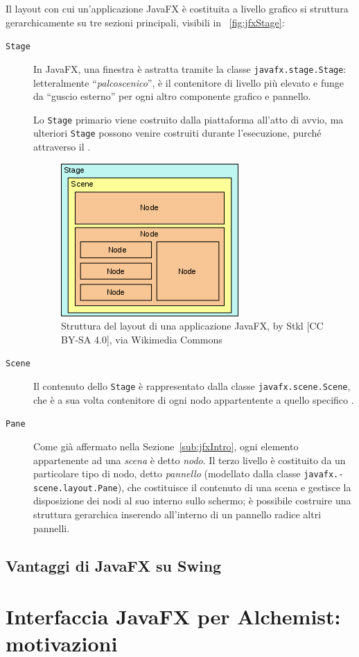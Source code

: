             Il layout con cui un'applicazione JavaFX è costituita a livello grafico si struttura gerarchicamente su tre sezioni principali, visibili in \figurename~\vref{fig:jfxStage}:

            \begin{description}
                \item[\texttt{Stage}] In JavaFX, una finestra è astratta tramite la classe \texttt{javafx\dothyp stage\dothyp Stage}: letteralmente ``\emph{palcoscenico}'',  è il contenitore di livello più elevato e funge da ``guscio esterno'' per ogni altro componente grafico e pannello.

                Lo \texttt{Stage} primario viene costruito dalla piattaforma all'atto di avvio, ma ulteriori \texttt{Stage} possono venire costruiti durante l'esecuzione, purché attraverso il .

            \begin{figure}[htbp]\label{fig:jfxStage}
                \centering
                \includegraphics[scale=1]{img/Javafx-stage-scene-node}
                \caption{Struttura del layout di una applicazione JavaFX, by Stkl [CC BY-SA 4.0], via Wikimedia Commons}
            \end{figure}

                \item[\texttt{Scene}] Il contenuto dello \texttt{Stage} è rappresentato dalla classe \texttt{javafx\dothyp scene\dothyp Scene}, che è a sua volta contenitore di ogni nodo appartentente a quello specifico .

                \item[\texttt{Pane}] Come già affermato nella Sezione~\vref{sub:jfxIntro}, ogni elemento appartenente ad una \emph{scena} è detto \emph{nodo}. Il terzo livello è costituito da un particolare tipo di nodo, detto \emph{pannello} (modellato dalla classe \texttt{javafx\dothyp scene\dothyp layout\dothyp Pane}), che costituisce il contenuto di una scena e gestisce la disposizione dei nodi al suo interno sullo schermo; è possibile costruire una struttura gerarchica inserendo all'interno di un pannello radice altri pannelli.
            \end{description}


        \subsection{Vantaggi di JavaFX su Swing}\label{sub:jfxVantaggi}
    \section{Interfaccia JavaFX per Alchemist: motivazioni}\label{sec:motivi}
